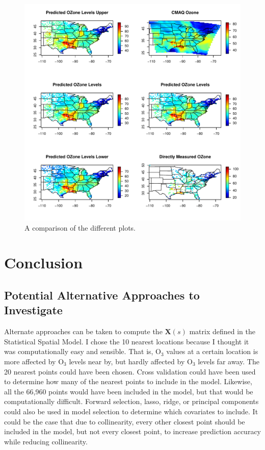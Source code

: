 \documentclass{article}                                                   %
\def\beginmyfig{\begin{figure}[htbp]\begin{center}}                       %
\def\endmyfig{\end{center}\end{figure}}                                   %
\begin{document}
    \beginmyfig  
      \includegraphics{raw/all.pdf}
      \caption{A comparison of the different plots.}
    \endmyfig

\section{Conclusion}
  \subsection{Potential Alternative Approaches to Investigate}
    Alternate approaches can be taken to compute the $\bm X(s)$ matrix defined
    in the Statistical Spatial Model. I chose the 10 nearest locations because
    I thought it was computationally easy and sensible. That is, O$_3$ values
    at a certain location is more affected by O$_3$ levels near by, but hardly
    affected by O$_3$ levels far away. The 20 nearest points could have been 
    chosen. Cross validation could have been used to determine how many of 
    the nearest points to include in the model. Likewise, all the 66,960 
    points would have been included in the model, but that would be computationally
    difficult. Forward selection, lasso, ridge, or principal components
    could also be used in model selection to determine which covariates to include.
    It could be the case that due to collinearity, every other closest
    point should be included in the model, but not every closest point, to 
    increase prediction accuracy while reducing collinearity.
\end{document}
